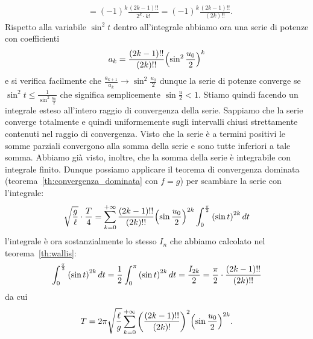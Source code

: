 \begin{example}
\begin{align*}
  &= (-1)^k\frac{(2k-1)!!}{2^k \cdot k!} = (-1)^k \frac{(2k-1)!!}{(2k)!!}.
\end{align*}
Rispetto alla variabile $\sin^2 t$ dentro all'integrale abbiamo ora una serie di potenze
con coefficienti
\[
 a_k = \frac{(2k-1)!!}{(2k)!!} {\left( \sin^2\frac{u_0} 2 \right)}^{k}
\]
e si verifica facilmente che
$  \frac{a_{k+1}}{a_k} \to \sin^2 \frac{u_0}{2}$
dunque la serie di potenze converge se
$ \sin^2 t \le \frac{1}{\sin^2 \frac{u_0}{2}}$
che significa semplicemente
$ \sin \frac u 2 < 1$.
Stiamo quindi facendo un integrale esteso all'intero raggio
di convergenza della serie. Sappiamo che la serie
converge totalmente e quindi uniformemente sugli intervalli
chiusi strettamente contenuti nel raggio di convergenza.
Visto che la serie è a termini positivi le somme parziali
convergono alla somma della serie e sono tutte inferiori
a tale somma.
Abbiamo già visto, inoltre, che la somma della serie
è integrabile con integrale finito.
Dunque possiamo applicare
il teorema di convergenza dominata (teorema~\ref{th:convergenza_dominata} con $f=g$)
per scambiare la serie con l'integrale:
\[
\sqrt{\frac g \ell} \cdot\frac{T}{4}
= \sum_{k=0}^{+\infty}\frac{(2k-1)!!}{(2k)!!} {\left( \sin \frac{u_0}2 \right)}^{2k}
\int_0^{\frac \pi 2}  {\left( \sin t \right)}^{2k}\, dt
\]
l'integrale è ora sostanzialmente lo stesso $I_n$ che abbiamo calcolato nel teorema~\ref{th:wallis}:
\[
  \int_0^{\frac \pi 2} {\left( \sin t \right)}^{2k}\, dt
  = \frac 1 2 \int_0^{\pi} {\left( \sin t \right)}^{2k}\, dt
  = \frac{I_{2k}}{2}
  = \frac \pi 2 \cdot\frac{(2k-1)!!}{(2k)!!}
\]
da cui
\[
T
= 2\pi\sqrt{\frac \ell g}\sum_{k=0}^{+\infty} {\left( \frac{(2k-1)!!}{(2k)!} \right)}^2
{\left( \sin \frac{u_0} 2 \right)}^{2k}.
\]


\end{example}
